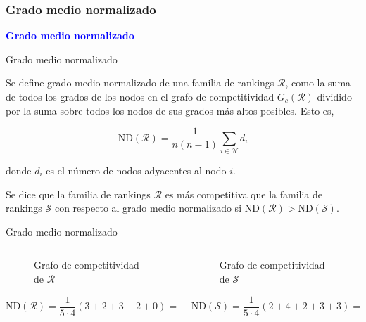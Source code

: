 \documentclass[10pt,hyperref={unicode}]{beamer}
\begin{document}
	\subsubsection{Grado medio normalizado}
	
	\begin{frame}
		\begin{center}
			\Huge\textbf{\textsf{\textcolor{blue}{Grado medio normalizado}}}
		\end{center}
	\end{frame}
	
	\begin{frame}{Grado medio normalizado}
		\begin{defi}
			Se define grado medio normalizado de una familia de rankings $\mathcal{R}$, como la suma de todos los grados de los nodos en el grafo de competitividad $G_c(\mathcal{R})$ dividido por la suma sobre todos los nodos de sus grados más altos posibles. Esto es,
			
			\begin{equation}
			\mathrm{ND}(\mathcal{R}) = \dfrac{1}{n(n-1)} \sum_{i \in \mathcal{N}} d_i
			\end{equation}
			
			donde $d_i$ es el número de nodos adyacentes al nodo  $i$.
		\end{defi}
		
		\begin{defi}
			Se dice que la familia de rankings $\mathcal{R}$ es más competitiva que la familia de rankings $\mathcal{S}$ con respecto al grado medio normalizado si $\mathrm{ND}(\mathcal{R}) > \mathrm{ND}(\mathcal{S})$.
		\end{defi}
	\end{frame}
	
	\begin{frame}{Grado medio normalizado}
		\begin{ejemplo}
			\begin{columns}[t] %
				\begin{column}{.50\textwidth}
					\begin{figure}
						\centering
						\resizebox{!}{0.3\textheight}{\ejemplografocompetitividad}
						\caption{Grafo de competitividad de $\mathcal{R}$}
					\end{figure}
					\[ \mathrm{ND}(\mathcal{R}) = \dfrac{1}{5\cdot 4} (3 + 2 + 3 + 2 + 0) =  \dfrac{1}{2} \]
				\end{column}%
				\hfill%
				\begin{column}{.50\textwidth}
					\begin{figure}
						\centering
						\resizebox{!}{0.3\textheight}{\ejemplogradomedio}
						\caption{Grafo de competitividad de $\mathcal{S}$}
					\end{figure}
					\[ \mathrm{ND}(\mathcal{S}) = \dfrac{1}{5\cdot 4} (2 + 4 + 2 + 3 + 3) =  \dfrac{7}{10} \]
				\end{column}%
			\end{columns}
		\end{ejemplo}
	\end{frame}
	
\end{document}
